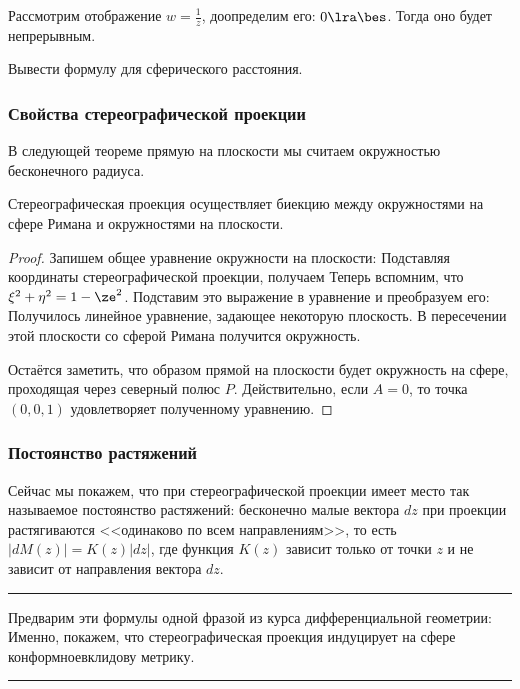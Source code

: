 \documentclass[a4paper]{article}
\newenvironment{petit}
{\par \smallskip \hrule \smallskip \footnotesize}
{\par \smallskip \hrule \smallskip}
\begin{document}
\begin{ex}
Рассмотрим отображение $w = \frac{1}{z}$, доопределим его: $0 \lra \bes$. Тогда оно будет непрерывным.
\end{ex}

\begin{problem}
Вывести формулу для сферического расстояния.
\end{problem}

\subsubsection{Свойства стереографической проекции}

В следующей теореме прямую на плоскости мы считаем окружностью бесконечного радиуса.

\begin{theorem}
Стереографическая проекция осуществляет биекцию между окружностями на сфере Римана и окружностями на плоскости.
\end{theorem}
\begin{proof}
Запишем общее уравнение окружности на плоскости:
Подставляя координаты стереографической проекции, получаем
Теперь вспомним, что $\xi^2+\eta^2 = 1-\ze^2$. Подставим это выражение в уравнение и преобразуем его:
Получилось линейное уравнение, задающее некоторую плоскость. В пересечении этой плоскости со сферой
Римана получится окружность.

Остаётся заметить, что образом прямой на плоскости будет окружность на сфере, проходящая через северный полюс $P$.
Действительно, если $A=0$, то точка $(0,0,1)$ удовлетворяет полученному уравнению.
\end{proof}

\subsubsection{Постоянство растяжений}

Сейчас мы покажем, что при стереографической проекции имеет место так называемое постоянство растяжений:
бесконечно малые вектора $dz$ при проекции растягиваются <<одинаково по всем направлениям>>, то есть
$|dM(z)| = K(z)|dz|$, где функция $K(z)$ зависит только от точки $z$ и не зависит от направления вектора $dz$.

\begin{petit}
Предварим эти формулы одной фразой из курса дифференциальной геометрии: Именно, покажем, что стереографическая проекция
индуцирует на сфере конформно\д евклидову метрику.
\end{petit}
\end{document}
